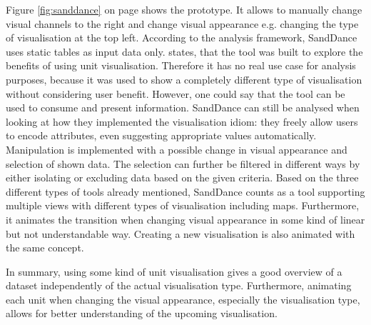 Figure \ref{fig:sanddance} on page \pageref{fig:sanddance} shows the prototype. It allows to manually change visual channels to the right and change visual appearance e.g. changing the type of visualisation at the top left. According to the analysis framework, SandDance uses static tables as input data only. \citeauthor{Drucker2015} states, that the tool was built to explore the benefits of using unit visualisation. Therefore it has no real use case for analysis purposes, because it was used to show a completely different type of visualisation without considering user benefit. However, one could say that the tool can be used to consume and present information.
SandDance can still be analysed when looking at how they implemented the visualisation idiom: they freely allow users to encode attributes, even suggesting appropriate values automatically. Manipulation is implemented with a possible change in visual appearance and selection of shown data. The selection can further be filtered in different ways by either isolating or excluding data based on the given criteria.
Based on the three different types of tools already mentioned, SandDance counts as a tool supporting multiple views with different types of visualisation including maps. Furthermore, it animates the transition when changing visual appearance in some kind of linear but not understandable way. Creating a new visualisation is also animated with the same concept.

In summary, using some kind of unit visualisation gives a good overview of a dataset independently of the actual visualisation type. Furthermore, animating each unit when changing the visual appearance, especially the visualisation type, allows for better understanding of the upcoming visualisation.